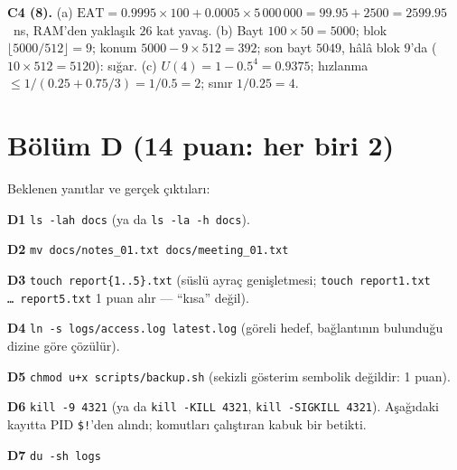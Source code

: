 \textbf{C4 (8).} (a) $\text{EAT} = 0.9995 \times 100 + 0.0005 \times 5\,000\,000 = 99.95 + 2500 = 2599.95$~ns, RAM'den yaklaşık $26$ kat yavaş. (b) Bayt $100 \times 50 = 5000$; blok $\lfloor 5000/512 \rfloor = 9$; konum $5000 - 9 \times 512 = 392$; son bayt $5049$, hâlâ blok $9$'da ($10 \times 512 = 5120$): sığar. (c) $U(4) = 1 - 0.5^{4} = 0.9375$; hızlanma $\le 1/(0.25 + 0.75/3) = 1/0.5 = 2$; sınır $1/0.25 = 4$.

\section*{Bölüm D (14 puan: her biri 2)}
Beklenen yanıtlar ve gerçek çıktıları:

\textbf{D1} \texttt{ls -lah docs} (ya da \texttt{ls -la -h docs}).

\textbf{D2} \texttt{mv docs/notes\_01.txt docs/meeting\_01.txt}

\textbf{D3} \texttt{touch report\{1..5\}.txt} (süslü ayraç genişletmesi; \texttt{touch report1.txt \dots\ report5.txt} 1 puan alır --- ``kısa'' değil).

\textbf{D4} \texttt{ln -s logs/access.log latest.log} (göreli hedef, bağlantının bulunduğu dizine göre çözülür).

\textbf{D5} \texttt{chmod u+x scripts/backup.sh} (sekizli gösterim sembolik değildir: 1 puan).

\textbf{D6} \texttt{kill -9 4321} (ya da \texttt{kill -KILL 4321}, \texttt{kill -SIGKILL 4321}). Aşağıdaki kayıtta PID \texttt{\$!}'den alındı; komutları çalıştıran kabuk bir betikti.

\textbf{D7} \texttt{du -sh logs}


